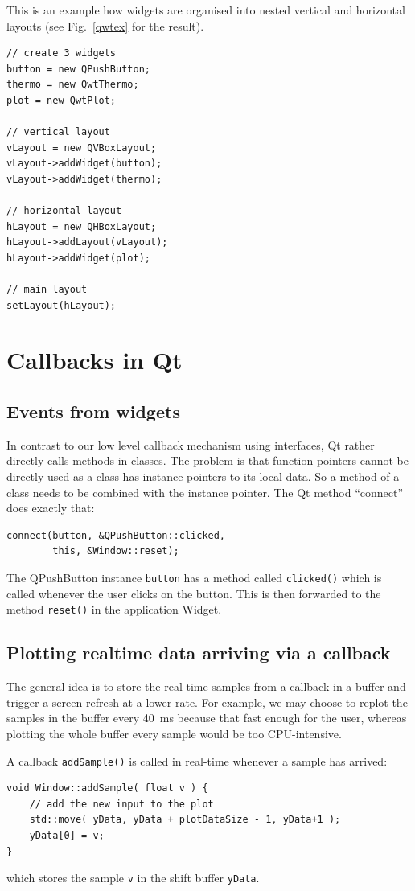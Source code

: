 \documentclass[12pt]{report}
\begin{document}
This is an example how widgets are organised into
nested vertical and horizontal layouts (see Fig.~\ref{qwtex}
for the result).
\begin{verbatim}
// create 3 widgets
button = new QPushButton;
thermo = new QwtThermo; 
plot = new QwtPlot;

// vertical layout
vLayout = new QVBoxLayout;
vLayout->addWidget(button);
vLayout->addWidget(thermo);

// horizontal layout
hLayout = new QHBoxLayout;
hLayout->addLayout(vLayout);
hLayout->addWidget(plot);

// main layout
setLayout(hLayout);
\end{verbatim}


\section{Callbacks in Qt}
\subsection{Events from widgets}
In contrast to our low level callback mechanism using interfaces, Qt rather
directly calls methods in classes. The problem is that function pointers
cannot be directly used as a class has instance pointers to its local
data. So a method of a class needs to be combined with the instance
pointer. The Qt method ``connect'' does exactly that:
\begin{verbatim}
connect(button, &QPushButton::clicked,
        this, &Window::reset);
\end{verbatim}
The QPushButton instance \texttt{button} has a method called \texttt{clicked()} which is
called whenever the user clicks on the button. This is then forwarded to the
method \texttt{reset()} in the application Widget.


\subsection{Plotting realtime data arriving via a callback}
The general idea is to store the real-time samples from a callback in a
buffer and trigger a screen refresh at a lower rate. For example, we may
choose to replot the samples in the buffer every
40~ms because that fast enough for the user, whereas plotting the
whole buffer every sample would be too CPU-intensive.

A callback \texttt{addSample()} is called in real-time whenever
a sample has arrived:
\begin{verbatim}
void Window::addSample( float v ) {
    // add the new input to the plot
    std::move( yData, yData + plotDataSize - 1, yData+1 );
    yData[0] = v;
}
\end{verbatim}
which stores the sample \texttt{v} in the shift buffer \texttt{yData}.
\end{document}

